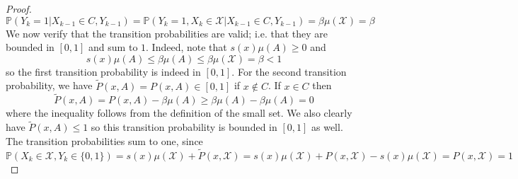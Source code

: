 \documentclass[12pt]{article}
\newcommand{\Prob}{\mathbb{P}}
\begin{document}
\begin{proof}
\[\Prob(Y_k = 1|X_{k-1} \in C, Y_{k-1}) = \Prob(Y_k = 1, X_k \in \mathcal{X}|X_{k-1} \in C, Y_{k-1}) = \beta \mu(\mathcal{X}) = \beta\]
We now verify that the transition probabilities are valid; i.e. that they are bounded in $[0, 1]$ and sum to $1$. Indeed, note that $s(x) \mu(A) \geq 0$ and 
\[s(x) \mu(A) \leq \beta \mu(A) \leq \beta \mu(\mathcal{X}) = \beta < 1\]
so the first transition probability is indeed in $[0, 1]$. For the second transition probability, we have $\tilde{P}(x, A) = P(x, A) \in [0, 1]$ if $x \notin C$. If $x \in C$ then 
\[\tilde{P}(x, A) = P(x, A) - \beta \mu(A) \geq \beta \mu(A) - \beta \mu(A) = 0\]
where the inequality follows from the definition of the small set. We also clearly have $\tilde{P}(x, A) \leq 1$ so this transition probability is bounded in $[0, 1]$ as well. The transition probabilities sum to one, 
since 
\[\Prob(X_k \in \mathcal{X}, Y_k \in \{0, 1\}) = s(x)\mu(\mathcal{X}) + \tilde{P}(x, \mathcal{X}) = s(x)\mu(\mathcal{X}) + P(x, \mathcal{X}) - s(x)\mu(\mathcal{X}) =  P(x, \mathcal{X}) = 1\]


\end{proof}
\end{document}
